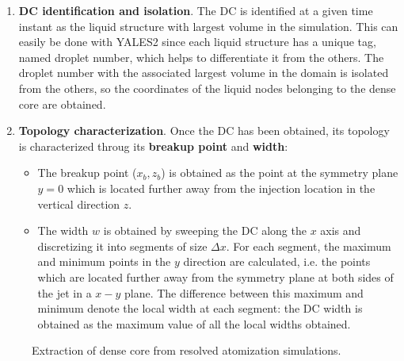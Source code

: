 \begin{enumerate}

	\item \textbf{DC identification and isolation}. The DC is identified at a given time instant as the liquid structure with largest volume in the simulation. This can easily be done with YALES2 since each liquid structure has a unique tag, named droplet number, which helps to differentiate it from the others. The droplet number with the associated largest volume in the domain is isolated from the others, so the coordinates of the liquid nodes belonging to the dense core are obtained.
	
	\item \textbf{Topology characterization}. Once the DC has been obtained, its topology is characterized throug its \textbf{breakup point} and \textbf{width}:
	
	\begin{itemize}
	
	
		\item The breakup point ($x_b, z_b$) is obtained as the point at the symmetry plane $y = 0$ which is located further away from the injection location in the vertical direction $z$.
		
		\item The width $w$ is obtained by sweeping the DC along the $x$ axis and discretizing it into segments of size $\Delta x$. For each segment, the maximum and minimum points in the $y$ direction are calculated, i.e. the points which are located further away from the symmetry plane at both sides of the jet in a $x-y$ plane. The difference between this maximum and minimum denote the local width at each segment: the DC width is obtained as the maximum value of all the local widths obtained.
	
	\end{itemize}
	
\end{enumerate}

\begin{figure}[ht]
     \centering
     \caption{Extraction of dense core from resolved atomization simulations.}
      \label{fig:dense_core_extraction}
\end{figure}


